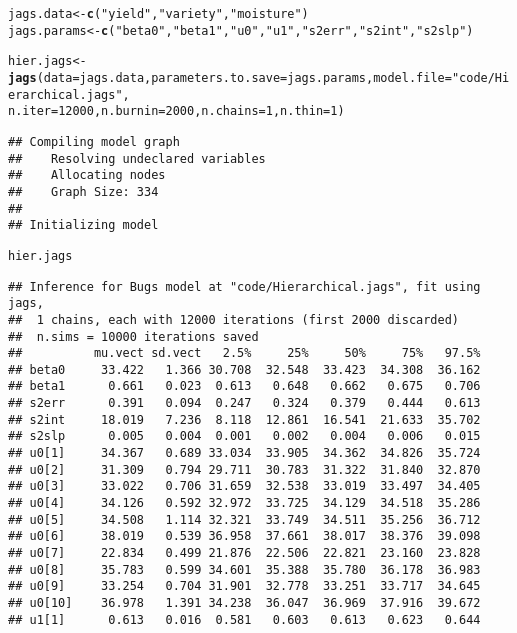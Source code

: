 \documentclass[12pt,letterpaper,oneside]{article}\usepackage{graphicx, color}
\makeatletter
\newcommand{\hlfunctioncall}[1]{\textcolor[rgb]{0.501960784313725,0,0.329411764705882}{\textbf{#1}}}%
\newcommand{\hlstring}[1]{\textcolor[rgb]{0.6,0.6,1}{#1}}%
\newenvironment{kframe}{%
 \def\at@end@of@kframe{}%
 \ifinner\ifhmode%
  \def\at@end@of@kframe{\end{minipage}}%
  \begin{minipage}{\columnwidth}%
 \fi\fi%
 \def\FrameCommand##1{\hskip\@totalleftmargin \hskip-\fboxsep
 \colorbox{shadecolor}{##1}\hskip-\fboxsep
     \hskip-\linewidth \hskip-\@totalleftmargin \hskip\columnwidth}%
 \MakeFramed {\advance\hsize-\width
   \@totalleftmargin\z@ \linewidth\hsize
   \@setminipage}}%
 {\par\unskip\endMakeFramed%
 \at@end@of@kframe}
\newenvironment{knitrout}{}{} %
\makeatother
\begin{document}
\begin{knitrout}\scriptsize
{}\color{fgcolor}\begin{kframe}
\begin{alltt}
jags.data <- \hlfunctioncall{c}(\hlstring{"yield"}, \hlstring{"variety"}, \hlstring{"moisture"})
jags.params <- \hlfunctioncall{c}(\hlstring{"beta0"}, \hlstring{"beta1"}, \hlstring{"u0"}, \hlstring{"u1"}, \hlstring{"s2err"}, \hlstring{"s2int"}, \hlstring{"s2slp"})

hier.jags <- \hlfunctioncall{jags}(data = jags.data, parameters.to.save = jags.params, model.file = \hlstring{"code/Hierarchical.jags"}, 
    n.iter = 12000, n.burnin = 2000, n.chains = 1, n.thin = 1)
\end{alltt}


{\ttfamily\noindent\itshape\color{messagecolor}{\#\# module glm loaded}}\begin{verbatim}
## Compiling model graph
##    Resolving undeclared variables
##    Allocating nodes
##    Graph Size: 334
## 
## Initializing model
\end{verbatim}
\begin{alltt}
hier.jags
\end{alltt}
\begin{verbatim}
## Inference for Bugs model at "code/Hierarchical.jags", fit using jags,
##  1 chains, each with 12000 iterations (first 2000 discarded)
##  n.sims = 10000 iterations saved
##          mu.vect sd.vect   2.5%     25%     50%     75%   97.5%
## beta0     33.422   1.366 30.708  32.548  33.423  34.308  36.162
## beta1      0.661   0.023  0.613   0.648   0.662   0.675   0.706
## s2err      0.391   0.094  0.247   0.324   0.379   0.444   0.613
## s2int     18.019   7.236  8.118  12.861  16.541  21.633  35.702
## s2slp      0.005   0.004  0.001   0.002   0.004   0.006   0.015
## u0[1]     34.367   0.689 33.034  33.905  34.362  34.826  35.724
## u0[2]     31.309   0.794 29.711  30.783  31.322  31.840  32.870
## u0[3]     33.022   0.706 31.659  32.538  33.019  33.497  34.405
## u0[4]     34.126   0.592 32.972  33.725  34.129  34.518  35.286
## u0[5]     34.508   1.114 32.321  33.749  34.511  35.256  36.712
## u0[6]     38.019   0.539 36.958  37.661  38.017  38.376  39.098
## u0[7]     22.834   0.499 21.876  22.506  22.821  23.160  23.828
## u0[8]     35.783   0.599 34.601  35.388  35.780  36.178  36.983
## u0[9]     33.254   0.704 31.901  32.778  33.251  33.717  34.645
## u0[10]    36.978   1.391 34.238  36.047  36.969  37.916  39.672
## u1[1]      0.613   0.016  0.581   0.603   0.613   0.623   0.644

\end{verbatim}
\end{kframe}
\end{knitrout}
\end{document}
